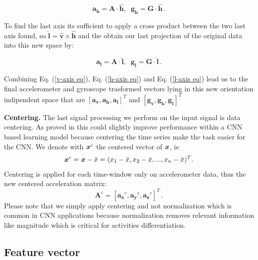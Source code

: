 \begin{equation}
	\label{h-axis eq}
	\boldsymbol{a_{h}} = \boldsymbol{A} \cdot \boldsymbol{\hat{h}} , \;\; \boldsymbol{g_{h}} = \boldsymbol{G} \cdot \boldsymbol{\hat{h}} \,.
\end{equation}

To find the last axis its sufficient to apply a cross product between the two last axis found, so $ \boldsymbol{\hat{l}} = \boldsymbol{\hat{v}} \times \boldsymbol{\hat{h}} $ and the obtain our last projection of the original data into this new space by:

\begin{equation}
	\label{l-axis eq}
	\boldsymbol{a_{l}} = \boldsymbol{A} \cdot \boldsymbol{\hat{l}} , \;\; \boldsymbol{g_{l}} = \boldsymbol{G} \cdot \boldsymbol{\hat{l}} \,.
\end{equation}



Combining Eq. (\ref{v-axis eq}), Eq. (\ref{h-axis eq}) and Eq. (\ref{l-axis eq}) lead us to the final accelerometer and gyroscope trasformed vectors lying in this new orientation indipendent space that are $[\boldsymbol{a_{v}}, \boldsymbol{a_{h}}, \boldsymbol{a_{l}}]^T $ and $ [\boldsymbol{g_{v}}, \boldsymbol{g_{h}}, \boldsymbol{g_{l}}]^T $

\vspace{1em}
\textbf{Centering.}
The last signal processing we perform on the input signal is data
centering. As proved in \cite{ignatov2018real} this could slightly
improve performance within a CNN based learning model because
centering the time series make the task easier for the CNN. We denote with $\boldsymbol{x}^{c}$ the centered vector of $\boldsymbol{x}$, ie
\begin{equation}
  \label{eq:centering-func}
  \x^{c} = \x - \bar{x} = (x_1-\bar{x}, x_2-\bar{x},..., x_n-\bar{x})^T.
\end{equation}
Centering is applied for each time-window only on accelerometer data, thus the new centered acceleration matrix:
\begin{equation}
  \label{eq:centering-accelerometer-data}
  \boldsymbol{A}^{c} = [\boldsymbol{a_{x}}^{c}, \boldsymbol{a_{y}}^{c}, \boldsymbol{a_{z}}^{c}]^T \,.
\end{equation}
Please note that we simply apply centering and not normalization which is common in CNN applications because normalization removes relevant information like magnitude which is critical for activities differentiation.

\subsection{Feature vector}
\label{subsec:feature-vector}

